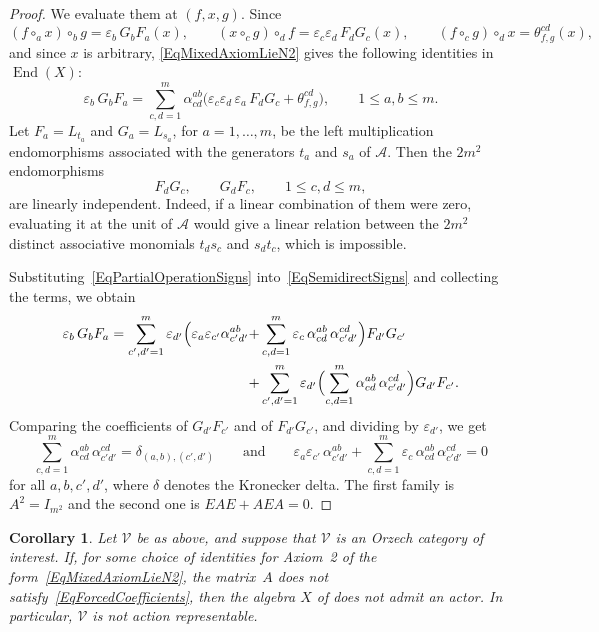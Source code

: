 \documentclass[reqno,a4paper]{amsart}
\theoremstyle{plain}
\newtheorem{corollary}[subsection]{Corollary}
\theoremstyle{definition}
\theoremstyle{remark}
\numberwithin{equation}{section}
\newcommand{\V}{\mathcal{V}}
\DeclareMathOperator{\End}{End}
\begin{document}
\begin{proof}
We evaluate them at $(f,x,g)$. Since
\[
(f\circ_ax)\circ_bg=\varepsilon_b\,G_bF_a(x),
\qquad
(x\circ_cg)\circ_df=\varepsilon_c\varepsilon_d\,F_dG_c(x),
\qquad
(f\circ_cg)\circ_dx=\theta^{cd}_{f,g}(x),
\]
and since $x$ is arbitrary, \eqref{EqMixedAxiomLieN2} gives the following identities in $\End(X)$:
\begin{equation}\label{EqSemidirectSigns}
\varepsilon_b\,G_bF_a
=
\sum_{c,d=1}^{m}\alpha^{ab}_{cd}
\bigl(
\varepsilon_c\varepsilon_d\,\varepsilon_a\,F_dG_c
+
\theta^{cd}_{f,g}
\bigr),
\qquad
1\leq a,b\leq m .
\end{equation}
Let $F_a=L_{t_a}$ and $G_a=L_{s_a}$, for $a=1,\ldots,m$, be the left multiplication endomorphisms associated with the generators $t_a$ and $s_a$ of $\mathcal A$. Then the $2m^2$ endomorphisms
\[
F_dG_c,
\qquad
G_dF_c,
\qquad
1\leq c,d\leq m,
\]
are linearly independent. Indeed, if a linear combination of them were zero, evaluating it at the unit of $\mathcal A$ would give a linear relation between the $2m^2$ distinct associative monomials $t_ds_c$ and $s_dt_c$, which is impossible.

Substituting~\eqref{EqPartialOperationSigns} into~\eqref{EqSemidirectSigns} and collecting the terms, we obtain
\begin{align*}
\varepsilon_b\,G_bF_a
=
\sum_{c',d'=1}^{m}\varepsilon_{d'}
\Bigl(
\varepsilon_a\varepsilon_{c'}\alpha^{ab}_{c'd'}
+&
\sum_{c,d=1}^{m}\varepsilon_c\,\alpha^{ab}_{cd}\,\alpha^{cd}_{c'd'}
\Bigr)F_{d'}G_{c'}\\
+&
\sum_{c',d'=1}^{m}\varepsilon_{d'}
\Bigl(
\sum_{c,d=1}^{m}\alpha^{ab}_{cd}\,\alpha^{cd}_{c'd'}
\Bigr)G_{d'}F_{c'} .
\end{align*}
Comparing the coefficients of $G_{d'}F_{c'}$ and of $F_{d'}G_{c'}$, and dividing by $\varepsilon_{d'}$, we get
\[
\sum_{c,d=1}^{m}\alpha^{ab}_{cd}\,\alpha^{cd}_{c'd'}=\delta_{(a,b),(c',d')}
\qquad\text{and}\qquad
\varepsilon_a\varepsilon_{c'}\,\alpha^{ab}_{c'd'}+\sum_{c,d=1}^{m}\varepsilon_c\,\alpha^{ab}_{cd}\,\alpha^{cd}_{c'd'}=0
\]
for all $a,b,c',d'$, where $\delta$ denotes the Kronecker delta. The first family is $A^2=I_{m^2}$ and the second one is $EAE+AEA=0$.
\end{proof}

\begin{corollary}\label{CorCriterion}
Let $\V$ be as above, and suppose that $\V$ is an Orzech category of interest. If, for some choice of identities for Axiom~2 of the form~\eqref{EqMixedAxiomLieN2}, the matrix~$A$ does not satisfy~\eqref{EqForcedCoefficients}, then the algebra $X$ of  does not admit an actor. In particular, $\V$ is not action representable.
\end{corollary}
\end{document}
